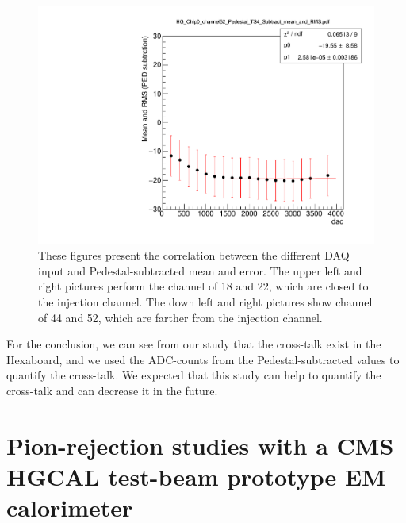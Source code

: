 \begin{figure}[!htb]
     \includegraphics[width=\cmsFigWidth]{PCB_study/HG_Chip0_channel52_Pedestal_TS4_Subtract_mean_and_RMS.pdf}
\caption{These figures present the correlation between the different DAQ input and Pedestal-subtracted mean and error. The upper left and right pictures perform the channel of 18 and 22, which are closed to the injection channel. The down left and right pictures show channel of 44 and 52, which are farther from the injection channel.}
\label{fig:PCB_injection_pulse_study}
\end{figure}

For the conclusion, we can see from our study that the cross-talk exist in the Hexaboard, and we used the ADC-counts from the Pedestal-subtracted values to quantify the cross-talk. We expected that this study can help to quantify the cross-talk and can decrease it in the future.

\section{Pion-rejection studies with a CMS HGCAL test-beam prototype EM calorimeter}

